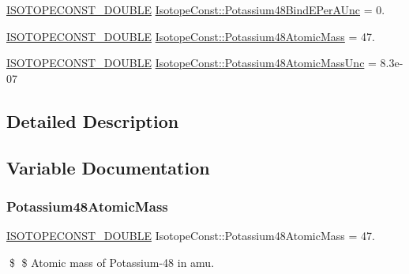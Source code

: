 \begin{DoxyCompactItemize}
\mbox{\hyperlink{group___isotope_const-_macros_ga8f45a7272ce02c0b4c65c44636ed719a}{I\+S\+O\+T\+O\+P\+E\+C\+O\+N\+S\+T\+\_\+\+D\+O\+U\+B\+LE}} \mbox{\hyperlink{group___isotope_const-_potassium-_k48_gad3e63f7aaded54cc3f8f8be47536b6fe}{Isotope\+Const\+::\+Potassium48\+Bind\+E\+Per\+A\+Unc}} = 0.
\item 
\mbox{\hyperlink{group___isotope_const-_macros_ga8f45a7272ce02c0b4c65c44636ed719a}{I\+S\+O\+T\+O\+P\+E\+C\+O\+N\+S\+T\+\_\+\+D\+O\+U\+B\+LE}} \mbox{\hyperlink{group___isotope_const-_potassium-_k48_ga4f3f98be1527b4980f511c911bf6bc32}{Isotope\+Const\+::\+Potassium48\+Atomic\+Mass}} = 47.
\item 
\mbox{\hyperlink{group___isotope_const-_macros_ga8f45a7272ce02c0b4c65c44636ed719a}{I\+S\+O\+T\+O\+P\+E\+C\+O\+N\+S\+T\+\_\+\+D\+O\+U\+B\+LE}} \mbox{\hyperlink{group___isotope_const-_potassium-_k48_ga7f56ac93c7a1b2137e26680cb68d6262}{Isotope\+Const\+::\+Potassium48\+Atomic\+Mass\+Unc}} = 8.\+3e-\/07
\end{DoxyCompactItemize}


\subsection{Detailed Description}


\subsection{Variable Documentation}
\mbox{\label{group___isotope_const-_potassium-_k48_ga4f3f98be1527b4980f511c911bf6bc32}} 
\subsubsection{\texorpdfstring{Potassium48\+Atomic\+Mass}{Potassium48AtomicMass}}
{\footnotesize\ttfamily \mbox{\hyperlink{group___isotope_const-_macros_ga8f45a7272ce02c0b4c65c44636ed719a}{I\+S\+O\+T\+O\+P\+E\+C\+O\+N\+S\+T\+\_\+\+D\+O\+U\+B\+LE}} Isotope\+Const\+::\+Potassium48\+Atomic\+Mass = 47.}

\$ \$ Atomic mass of Potassium-\/48 in amu. \mbox{\label{group___isotope_const-_potassium-_k48_ga7f56ac93c7a1b2137e26680cb68d6262}} 
